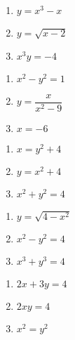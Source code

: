 \documentclass{ximera}
\begin{document}
\begin{multicols}{3}
\begin{enumerate}
\setcounter{enumi}{\value{HW}}

\item $y = x^{3} - x$ \label{equfunctionfirst}
\item $y = \sqrt{x - 2}$
\item $x^{3}y = -4$ 
\setcounter{HW}{\value{enumi}}
\end{enumerate}
\end{multicols}

\begin{multicols}{3}
\begin{enumerate}
\setcounter{enumi}{\value{HW}}

\item $x^{2} - y^{2} = 1$
\item $y = \dfrac{x}{x^{2} - 9}$
\item $x = -6$

\setcounter{HW}{\value{enumi}}
\end{enumerate}
\end{multicols}

\begin{multicols}{3}
\begin{enumerate}
\setcounter{enumi}{\value{HW}}

\item  $x = y^2 + 4$

\item $y = x^2 + 4$
\item $x^2 + y^2 = 4$

\setcounter{HW}{\value{enumi}}
\end{enumerate}
\end{multicols}

\begin{multicols}{3}
\begin{enumerate}
\setcounter{enumi}{\value{HW}}


\item $y = \sqrt{4-x^2}$
\item $x^2 - y^2 = 4$
\item $x^3 + y^3 = 4$


\setcounter{HW}{\value{enumi}}
\end{enumerate}
\end{multicols}

\begin{multicols}{3}
\begin{enumerate}
\setcounter{enumi}{\value{HW}}

\item $2x + 3y = 4$
\item $2xy = 4$
\item $x^2 = y^2$ \label{equfunctionlast}

\setcounter{HW}{\value{enumi}}
\end{enumerate}
\end{multicols}
\end{document}
